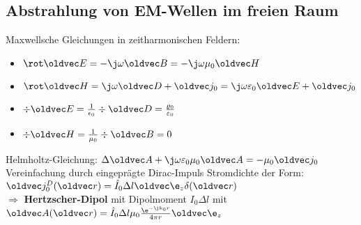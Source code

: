 \documentclass[6pt,a4paper]{scrartcl}
\let\vec\oldvec
\begin{document}
\begin{multicols}{4}
	\subsection{Abstrahlung von EM-Wellen im freien Raum}
	Maxwellsche Gleichungen in zeitharmonischen Feldern:
	\begin{itemize}
		\item $\rot\vec E = -\j\omega\vec B = -\j\omega\mu_0\vec H$
		\item $\rot\vec H = \j\omega\vec D + \vec j_0 = \j\omega\varepsilon_0\vec E+\vec j_0$
		\item $\div\vec E = \frac{1}{\epsilon_0}\div\vec D = \frac{\varrho_0}{\varepsilon_0}$
		\item $\div\vec H = \frac{1}{\mu_0}\div\vec B = 0$
	\end{itemize}
	Helmholtz-Gleichung: $\Delta\vec A + \j\omega\varepsilon_0\mu_0\vec A = -\mu_0\vec j_0$\\
	Vereinfachung durch eingeprägte Dirac-Impuls Stromdichte der Form: $\vec j_0^D(\vec  r) = \hat I_0\Delta l\vec\e_z\delta(\vec r)$\\
	$\Rightarrow$ \textbf{Hertzscher-Dipol} mit Dipolmoment $I_0\Delta l$ mit $\vec A(\vec r) = \hat I_0\Delta l\mu_0\frac{\e^{-\j k_0r}}{4\pi r}\vec\e_z$\\

\end{multicols}
\end{document}
